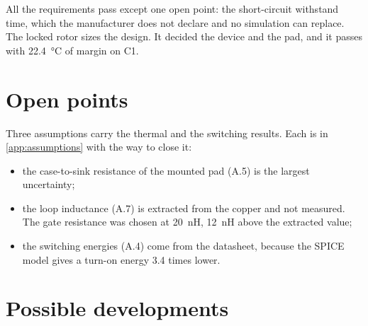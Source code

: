 All the requirements pass except one open point: the short-circuit withstand
time, which the manufacturer does not declare and no simulation can replace.
The locked rotor sizes the design. It decided the device and the pad, and it
passes with \SI{22.4}{\celsius} of margin on C1.

\section{Open points}

Three assumptions carry the thermal and the switching results. Each is in
\cref{app:assumptions} with the way to close it:
\begin{itemize}
  \item the case-to-sink resistance of the mounted pad (A.5) is the largest
        uncertainty;
  \item the loop inductance (A.7) is extracted from the copper and not
        measured. The gate resistance was chosen at \SI{20}{\nano\henry},
        \SI{12}{\nano\henry} above the extracted value;
  \item the switching energies (A.4) come from the datasheet, because the
        SPICE model gives a turn-on energy 3.4 times lower.
\end{itemize}

\section{Possible developments}


